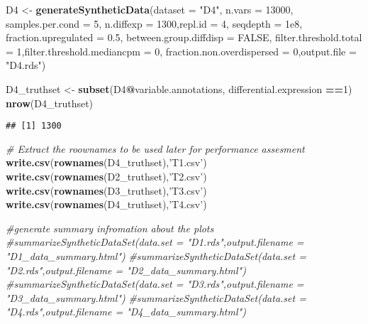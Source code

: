 \documentclass[]{article}
\newenvironment{Shaded}{\begin{snugshade}}{\end{snugshade}}
\newcommand{\CommentTok}[1]{\textcolor[rgb]{0.56,0.35,0.01}{\textit{#1}}}
\newcommand{\DataTypeTok}[1]{\textcolor[rgb]{0.13,0.29,0.53}{#1}}
\newcommand{\DecValTok}[1]{\textcolor[rgb]{0.00,0.00,0.81}{#1}}
\newcommand{\FloatTok}[1]{\textcolor[rgb]{0.00,0.00,0.81}{#1}}
\newcommand{\KeywordTok}[1]{\textcolor[rgb]{0.13,0.29,0.53}{\textbf{#1}}}
\newcommand{\NormalTok}[1]{#1}
\newcommand{\OperatorTok}[1]{\textcolor[rgb]{0.81,0.36,0.00}{\textbf{#1}}}
\newcommand{\OtherTok}[1]{\textcolor[rgb]{0.56,0.35,0.01}{#1}}
\newcommand{\StringTok}[1]{\textcolor[rgb]{0.31,0.60,0.02}{#1}}
\begin{document}
\begin{Shaded}
\begin{Highlighting}[]
\NormalTok{D4 <-}\StringTok{ }\KeywordTok{generateSyntheticData}\NormalTok{(}\DataTypeTok{dataset =} \StringTok{"D4"}\NormalTok{, }\DataTypeTok{n.vars =} \DecValTok{13000}\NormalTok{,}
             \DataTypeTok{samples.per.cond =} \DecValTok{5}\NormalTok{, }\DataTypeTok{n.diffexp =} \DecValTok{1300}\NormalTok{,}\DataTypeTok{repl.id =} \DecValTok{4}\NormalTok{, }\DataTypeTok{seqdepth =} \FloatTok{1e8}\NormalTok{,}
             \DataTypeTok{fraction.upregulated =} \FloatTok{0.5}\NormalTok{, }\DataTypeTok{between.group.diffdisp =} \OtherTok{FALSE}\NormalTok{,}
             \DataTypeTok{filter.threshold.total =} \DecValTok{1}\NormalTok{,}\DataTypeTok{filter.threshold.mediancpm =} \DecValTok{0}\NormalTok{,}
             \DataTypeTok{fraction.non.overdispersed =} \DecValTok{0}\NormalTok{,}\DataTypeTok{output.file =} \StringTok{"D4.rds"}\NormalTok{)}

\NormalTok{D4_truthset <-}\StringTok{ }\KeywordTok{subset}\NormalTok{(D4}\OperatorTok{@}\NormalTok{variable.annotations, differential.expression }\OperatorTok{==}\DecValTok{1}\NormalTok{)}
\KeywordTok{nrow}\NormalTok{(D4_truthset)}
\end{Highlighting}
\end{Shaded}

\begin{verbatim}
## [1] 1300
\end{verbatim}

\begin{Shaded}
\begin{Highlighting}[]
\CommentTok{# Extract the roownames to be used later for performance assesment}
\KeywordTok{write.csv}\NormalTok{(}\KeywordTok{rownames}\NormalTok{(D4_truthset),}\StringTok{'T1.csv'}\NormalTok{)}
\KeywordTok{write.csv}\NormalTok{(}\KeywordTok{rownames}\NormalTok{(D2_truthset),}\StringTok{'T2.csv'}\NormalTok{)}
\KeywordTok{write.csv}\NormalTok{(}\KeywordTok{rownames}\NormalTok{(D3_truthset),}\StringTok{'T3.csv'}\NormalTok{)}
\KeywordTok{write.csv}\NormalTok{(}\KeywordTok{rownames}\NormalTok{(D4_truthset),}\StringTok{'T4.csv'}\NormalTok{)}

\CommentTok{#generate summary infromation about the plots}
\CommentTok{#summarizeSyntheticDataSet(data.set = "D1.rds",output.filename = "D1_data_summary.html")}
\CommentTok{#summarizeSyntheticDataSet(data.set = "D2.rds",output.filename = "D2_data_summary.html")}
\CommentTok{#summarizeSyntheticDataSet(data.set = "D3.rds",output.filename = "D3_data_summary.html")}
\CommentTok{#summarizeSyntheticDataSet(data.set = "D4.rds",output.filename = "D4_data_summary.html")}
\end{Highlighting}
\end{Shaded}
\end{document}
